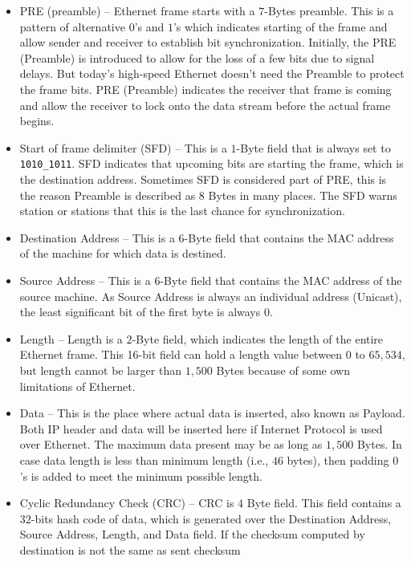 \documentclass{article}
\begin{document}
\begin{itemize}
\item PRE (preamble) – Ethernet frame starts with a $7$-Bytes preamble. This
  is a pattern of alternative $0$’s and $1$’s which indicates starting of
  the frame and allow sender and receiver to establish bit
  synchronization. Initially, the PRE (Preamble) is introduced to allow
  for the loss of a few bits due to signal delays. But today’s
  high-speed Ethernet doesn’t need the Preamble to protect the frame
  bits. PRE (Preamble) indicates the receiver that frame is coming and
  allow the receiver to lock onto the data stream before the actual
  frame begins.  
\item Start of frame delimiter (SFD) – This is a $1$-Byte field that is
  always set to \verb!1010_1011!. SFD indicates that upcoming bits are
  starting the frame, which is the destination address. Sometimes SFD
  is considered part of PRE, this is the reason Preamble is described
  as 8 Bytes in many places. The SFD warns station or stations that
  this is the last chance for synchronization.  
\item Destination Address – This is a $6$-Byte field that contains the
  MAC address of the machine for which data is destined.  
\item Source Address – This is a $6$-Byte field that contains the MAC
  address of the source machine. As Source Address is always an
  individual address (Unicast), the least significant bit of the first
  byte is always $0$.  
\item Length – Length is a $2$-Byte field, which indicates the length of
  the entire Ethernet frame. This 16-bit field can hold a length value
  between $0$ to $65,534$, but length cannot be larger than $1,500$ Bytes
  because of some own limitations of Ethernet.  
\item Data – This is the place where actual data is inserted, also
  known as Payload. Both IP header and data will be inserted here if
  Internet Protocol is used over Ethernet. The maximum data present
  may be as long as $1,500$ Bytes. In case data length is less than
  minimum length (i.e., $46$ bytes), then padding $0$’s is added to meet the
  minimum possible length.
\item Cyclic Redundancy Check (CRC) – CRC is $4$ Byte field. This field
  contains a $32$-bits hash code of data, which is generated over the
  Destination Address, Source Address, Length, and Data field. If the
  checksum computed by destination is not the same as sent checksum

\end{itemize}
\end{document}
